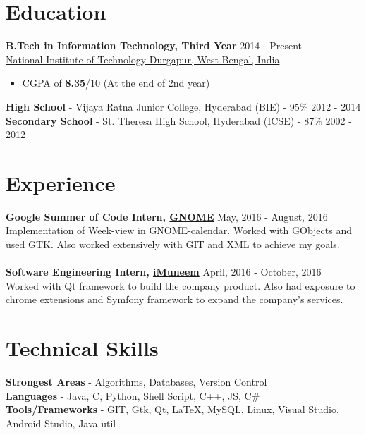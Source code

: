 \documentclass[margin, centered]{res}
\begin{document}
\begin{resume}

\section{Education}
\textbf{B.Tech in Information Technology, Third Year} \hfill 2014 - Present \\
\href{http://nitdgp.ac.in/}{National Institute of Technology Durgapur, West Bengal, India}
\begin{itemize}
 \item CGPA of \textbf{8.35}/10 (At the end of 2nd year)
\end{itemize}
\textbf{High School} - Vijaya Ratna Junior College, Hyderabad (BIE) - 95\% \hfill 2012 - 2014 \\
\textbf{Secondary School} - St. Theresa High School, Hyderabad (ICSE) - 87\% \hfill 2002 - 2012
 
\section{Experience}
\textbf{Google Summer of Code Intern, \href{https://summerofcode.withgoogle.com/archive/2016/projects/5194537727164416/}{GNOME}} \hfill May, 2016 - August, 2016\\
Implementation of Week-view in GNOME-calendar. Worked with GObjects and used GTK. Also worked extensively with GIT and XML to achieve my goals.   \\
\\
\textbf{Software Engineering Intern, \href{http://www.imuneem.com/}{iMuneem}} \hfill April, 2016 - October, 2016\\
Worked with Qt framework to build the company product. Also had exposure to chrome extensions and Symfony framework to expand the company's services. 

\section{Technical \hspace{2mm} Skills}
\textbf{Strongest Areas} - Algorithms, Databases, Version Control\\
\textbf{Languages} - Java, C, Python, Shell Script, C++, JS, C\#\\
\textbf{Tools/Frameworks} - GIT, Gtk, Qt, \LaTeX, MySQL, Linux, Visual Studio, Android Studio, Java util


\end{resume}
\end{document}
